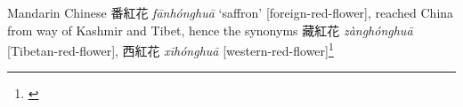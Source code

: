 \begin{etymology}\label{ety:fanhonghua}
Mandarin Chinese {番紅花} \textit{fānhónghuā} `saffron' [foreign-red-flower], reached China from way of Kashmir and Tibet, hence the synonyms 藏紅花 \textit{zànghónghuā} [Tibetan-red-flower], 西紅花 \textit{xīhónghuā} [western-red-flower]\footnote{\textcite{kleeman_oxford_2010}}
\end{etymology}